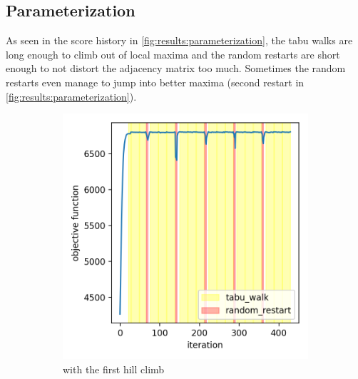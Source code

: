 \documentclass[sigconf, fleqn, prologue, dvipsnames]{acmart}
\begin{document}
\subsection{Parameterization}
As seen in the score history in \autoref{fig:results:parameterization}, the tabu walks are long enough to climb out of local maxima and the random restarts are short enough to not distort the adjacency matrix too much.
Sometimes the random restarts even manage to jump into better maxima (second restart in \autoref{fig:results:parameterization}).

\begin{figure}
	\centering
	\begin{subfigure}{0.2\textwidth}
		\centering
		\includegraphics[scale=0.35]{graphics/scores_small_2t_2.png}
		\caption{with the first hill climb}
	\end{subfigure}
	\begin{subfigure}{0.2\textwidth}
		\centering

\end{subfigure}
\end{figure}
\end{document}

